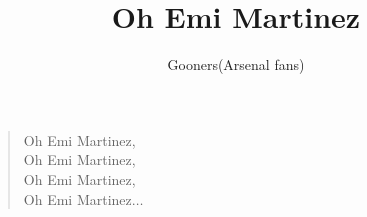 \documentclass[a4paper,12pt]{article}
\title{Oh Emi Martinez}
\author{Gooners(Arsenal fans)}
\date{}
\begin{document}
	
	\maketitle
	
	\begin{verse}
		
		Oh Emi Martinez, \\
		Oh Emi Martinez, \\
		Oh Emi Martinez, \\
		Oh Emi Martinez$\ldots$
		
	\end{verse}
	
\end{document}
